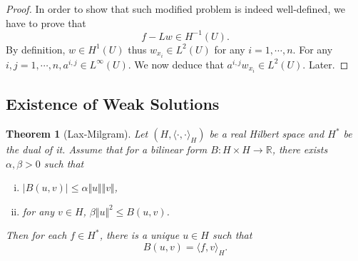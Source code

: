 \documentclass{article}
\newtheorem{theorem}{Theorem}[section]
\numberwithin{equation}{section}
\begin{document}
\begin{proof}
In order to show that such modified problem is indeed well-defined, we have to prove that
\begin{equation*}
f-Lw\in H^{-1}(U).
\end{equation*}
By definition, $w\in H^1(U)$ thus $w_{x_i}\in L^2(U)$ for any $i=1,\cdots,n$. For any $i,j=1,\cdots,n, a^{i,j}\in L^\infty(U)$. We now deduce that $a^{i,j}w_{x_i}\in L^2(U)$. Later.
\end{proof}

\subsection{Existence of Weak Solutions}

\begin{theorem}[Lax-Milgram]
\label{LM}
Let $(H,\langle\cdot,\cdot\rangle_H)$ be a real Hilbert space and $H^*$ be the dual of it. Assume that for a bilinear form $B:H\times H\to\mathbb{R}$, there exists $\alpha,\beta>0$ such that
\begin{enumerate}[i).]
\item $\vert B(u,v)\vert\leq \alpha\Vert u\Vert\Vert v\Vert$,
\item for any $v\in H$, $\beta\Vert u\Vert^2\leq B(u,v)$.
\end{enumerate}
Then for each $f\in H^*$, there is a unique $u\in H$ such that
\begin{equation*}
B(u,v) = \langle f,v\rangle_H.
\end{equation*}
\end{theorem}
\end{document}
